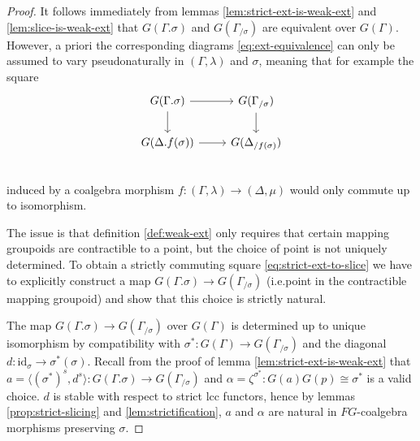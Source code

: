 \documentclass[a4paper]{article}
\theoremstyle{remark}
\theoremstyle{definition}
\begin{document}
\begin{proof}
  It follows immediately from lemmas \ref{lem:strict-ext-is-weak-ext} and \ref{lem:slice-is-weak-ext} that $G(\Gamma.\sigma)$ and $G(\Gamma_{/ \sigma})$ are equivalent over $G(\Gamma)$.
  However, a priori the corresponding diagrams \eqref{eq:ext-equivalence} can only be assumed to vary pseudonaturally in $(\Gamma, \lambda)$ and $\sigma$, meaning that for example the square
  \begin{equation}
    \label{eq:strict-ext-to-slice}
    \begin{tikzcd}
      G(\Gamma.\sigma) \arrow[r] \arrow[d] & G(\Gamma_{/ \sigma}) \arrow[d] \\
      G(\Delta.f(\sigma)) \arrow[r] & G(\Delta_{/ f(\sigma)}) \\
    \end{tikzcd}
  \end{equation}
  induced by a coalgebra morphism $f : (\Gamma, \lambda) \rightarrow (\Delta, \mu)$ would only commute up to isomorphism.

  The issue is that definition \ref{def:weak-ext} only requires that certain mapping groupoids are contractible to a point, but the choice of point is not uniquely determined.
  To obtain a strictly commuting square \eqref{eq:strict-ext-to-slice} we have to explicitly construct a map $G(\Gamma.\sigma) \rightarrow G(\Gamma_{/ \sigma})$ (i.e.\@ point in the contractible mapping groupoid) and show that this choice is strictly natural.

  The map $G(\Gamma.\sigma) \rightarrow G(\Gamma_{/ \sigma})$ over $G(\Gamma)$ is determined up to unique isomorphism by compatibility with $\sigma^* : G(\Gamma) \rightarrow G(\Gamma_{/ \sigma})$ and the diagonal $d : \mathrm{id}_\sigma \rightarrow \sigma^*(\sigma)$.
  Recall from the proof of lemma \ref{lem:strict-ext-is-weak-ext} that $a = \langle (\sigma^*)^s, d^s \rangle : G(\Gamma.\sigma) \rightarrow G(\Gamma_{/ \sigma})$ and $\alpha = \zeta^{\sigma^*} : G(a) G(p) \cong \sigma^*$ is a valid choice.
  $d$ is stable with respect to strict lcc functors, hence by lemmas \ref{prop:strict-slicing} and \ref{lem:strictification}, $a$ and $\alpha$ are natural in $FG$-coalgebra morphisms preserving $\sigma$.


\end{proof}
\end{document}
